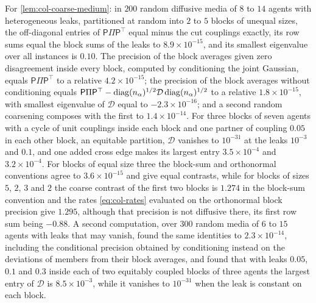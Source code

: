 \begin{numcheck}\label{chk:col-coarse-medium}
For \cref{lem:col-coarse-medium}: in $200$ random diffusive media of $8$ to $14$ agents with heterogeneous leaks, partitioned at random into $2$ to $5$ blocks of unequal sizes, the off-diagonal entries of $\mathsf P\Pi\mathsf P^\top$ equal minus the cut couplings exactly, its row sums equal the block sums of the leaks to $8.9\times10^{-15}$, and its smallest eigenvalue over all instances is $0.10$. The precision of the block averages given zero disagreement inside every block, computed by conditioning the joint Gaussian, equals $\mathsf P\Pi\mathsf P^\top$ to a relative $4.2\times10^{-15}$; the precision of the block averages without conditioning equals $\mathsf P\Pi\mathsf P^\top-\operatorname{diag}(n_\alpha)^{1/2}\mathcal D\operatorname{diag}(n_\alpha)^{1/2}$ to a relative $1.8\times10^{-15}$, with smallest eigenvalue of $\mathcal D$ equal to $-2.3\times10^{-16}$; and a second random coarsening composes with the first to $1.4\times10^{-14}$. For three blocks of seven agents with a cycle of unit couplings inside each block and one partner of coupling $0.05$ in each other block, an equitable partition, $\mathcal D$ vanishes to $10^{-31}$ at the leaks $10^{-3}$ and $0.1$, and one added cross edge makes its largest entry $3.5\times10^{-4}$ and $3.2\times10^{-4}$. For blocks of equal size three the block-sum and orthonormal conventions agree to $3.6\times10^{-15}$ and give equal contrasts, while for blocks of sizes $5$, $2$, $3$ and $2$ the coarse contrast of the first two blocks is $1.274$ in the block-sum convention and the rates \eqref{eq:col-rates} evaluated on the orthonormal block precision give $1.295$, although that precision is not diffusive there, its first row sum being $-0.88$. A second computation, over $300$ random media of $6$ to $15$ agents with leaks that may vanish, found the same identities to $2.3\times10^{-14}$, including the conditional precision obtained by conditioning instead on the deviations of members from their block averages, and found that with leaks $0.05$, $0.1$ and $0.3$ inside each of two equitably coupled blocks of three agents the largest entry of $\mathcal D$ is $8.5\times10^{-3}$, while it vanishes to $10^{-31}$ when the leak is constant on each block.
\end{numcheck}


